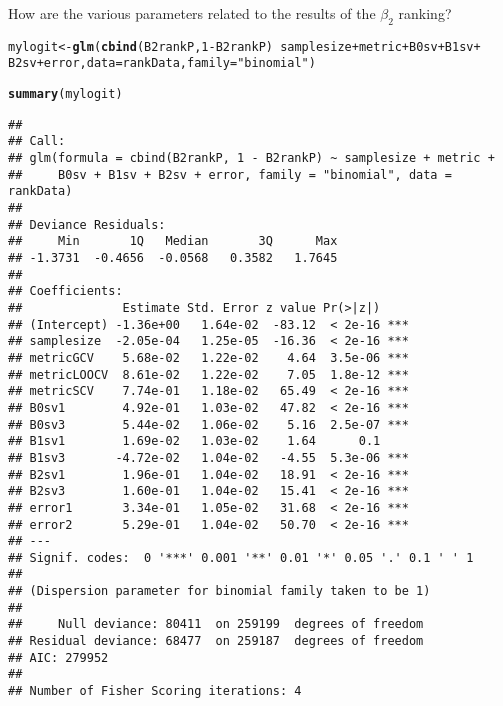 \documentclass{article}\usepackage[]{graphicx}\usepackage[]{color}
\makeatletter
\newcommand{\hlnum}[1]{\textcolor[rgb]{0.686,0.059,0.569}{#1}}%
\newcommand{\hlstr}[1]{\textcolor[rgb]{0.192,0.494,0.8}{#1}}%
\newcommand{\hlopt}[1]{\textcolor[rgb]{0,0,0}{#1}}%
\newcommand{\hlstd}[1]{\textcolor[rgb]{0.345,0.345,0.345}{#1}}%
\newcommand{\hlkwb}[1]{\textcolor[rgb]{0.69,0.353,0.396}{#1}}%
\newcommand{\hlkwc}[1]{\textcolor[rgb]{0.333,0.667,0.333}{#1}}%
\newcommand{\hlkwd}[1]{\textcolor[rgb]{0.737,0.353,0.396}{\textbf{#1}}}%
\newenvironment{kframe}{%
 \def\at@end@of@kframe{}%
 \ifinner\ifhmode%
  \def\at@end@of@kframe{\end{minipage}}%
  \begin{minipage}{\columnwidth}%
 \fi\fi%
 \def\FrameCommand##1{\hskip\@totalleftmargin \hskip-\fboxsep
 \colorbox{shadecolor}{##1}\hskip-\fboxsep
     \hskip-\linewidth \hskip-\@totalleftmargin \hskip\columnwidth}%
 \MakeFramed {\advance\hsize-\width
   \@totalleftmargin\z@ \linewidth\hsize
   \@setminipage}}%
 {\par\unskip\endMakeFramed%
 \at@end@of@kframe}
\newenvironment{knitrout}{}{} %
\makeatother
\begin{document}
How are the various parameters related to the results of the $\beta _2$ ranking?
\begin{knitrout}
\color{fgcolor}\begin{kframe}
\begin{alltt}
\hlstd{mylogit} \hlkwb{<-} \hlkwd{glm}\hlstd{(}\hlkwd{cbind}\hlstd{(B2rankP,} \hlnum{1} \hlopt{-} \hlstd{B2rankP)} \hlopt{~} \hlstd{samplesize} \hlopt{+} \hlstd{metric} \hlopt{+} \hlstd{B0sv} \hlopt{+} \hlstd{B1sv} \hlopt{+}
    \hlstd{B2sv} \hlopt{+} \hlstd{error,} \hlkwc{data} \hlstd{= rankData,} \hlkwc{family} \hlstd{=} \hlstr{"binomial"}\hlstd{)}
\end{alltt}


{\ttfamily\noindent\color{warningcolor}{\#\# Warning: non-integer counts in a binomial glm!}}\begin{alltt}
\hlkwd{summary}\hlstd{(mylogit)}
\end{alltt}
\begin{verbatim}
## 
## Call:
## glm(formula = cbind(B2rankP, 1 - B2rankP) ~ samplesize + metric + 
##     B0sv + B1sv + B2sv + error, family = "binomial", data = rankData)
## 
## Deviance Residuals: 
##     Min       1Q   Median       3Q      Max  
## -1.3731  -0.4656  -0.0568   0.3582   1.7645  
## 
## Coefficients:
##              Estimate Std. Error z value Pr(>|z|)    
## (Intercept) -1.36e+00   1.64e-02  -83.12  < 2e-16 ***
## samplesize  -2.05e-04   1.25e-05  -16.36  < 2e-16 ***
## metricGCV    5.68e-02   1.22e-02    4.64  3.5e-06 ***
## metricLOOCV  8.61e-02   1.22e-02    7.05  1.8e-12 ***
## metricSCV    7.74e-01   1.18e-02   65.49  < 2e-16 ***
## B0sv1        4.92e-01   1.03e-02   47.82  < 2e-16 ***
## B0sv3        5.44e-02   1.06e-02    5.16  2.5e-07 ***
## B1sv1        1.69e-02   1.03e-02    1.64      0.1    
## B1sv3       -4.72e-02   1.04e-02   -4.55  5.3e-06 ***
## B2sv1        1.96e-01   1.04e-02   18.91  < 2e-16 ***
## B2sv3        1.60e-01   1.04e-02   15.41  < 2e-16 ***
## error1       3.34e-01   1.05e-02   31.68  < 2e-16 ***
## error2       5.29e-01   1.04e-02   50.70  < 2e-16 ***
## ---
## Signif. codes:  0 '***' 0.001 '**' 0.01 '*' 0.05 '.' 0.1 ' ' 1
## 
## (Dispersion parameter for binomial family taken to be 1)
## 
##     Null deviance: 80411  on 259199  degrees of freedom
## Residual deviance: 68477  on 259187  degrees of freedom
## AIC: 279952
## 
## Number of Fisher Scoring iterations: 4
\end{verbatim}
\end{kframe}
\end{knitrout}
\end{document}

